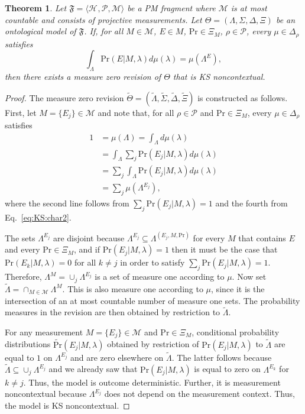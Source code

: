 \documentclass[DIV=calc,fontsize=12pt]{scrartcl} %
\theoremstyle{definition}
\theoremstyle{plain}
\newtheorem{theorem}[definition]{Theorem}
\newcommand{\Hilb}[1][]{\ensuremath{\mathcal{H}_{#1}}}
\begin{document}
\begin{theorem}
\label{prop:KS:conv}
Let $\mathfrak{F} = \langle \Hilb, \mathcal{P}, \mathcal{M} \rangle$
be a PM fragment where $\mathcal{M}$ is at most countable and
consists of projective measurements.  Let $\Theta = (\Lambda,
\Sigma, \Delta, \Xi)$ be an ontological model of $\mathfrak{F}$.
If, for all $M \in \mathcal{M}$, $E \in M$, $\mathrm{Pr} \in \Xi_M$,
$\rho \in \mathcal{P}$, every $\mu \in \Delta_{\rho}$ satisfies
\begin{equation}
\label{eq:KS:char2}
\int_{\Lambda} \mathrm{Pr}(E|M,\lambda) d\mu(\lambda) =
\mu(\Lambda^E),
\end{equation}
then there exists a measure zero revision of $\Theta$ that is KS
noncontextual.
\end{theorem}
\begin{proof}
The measure zero revision $\tilde{\Theta} = (\tilde{\Lambda},
\tilde{\Sigma}, \tilde{\Delta}, \tilde{\Xi})$ is constructed as
follows.  First, let $M = \{E_j\} \in \mathcal{M}$ and note that,
for all $\rho \in \mathcal{P}$ and $\text{Pr} \in \Xi_M$, every $\mu
\in \Delta_{\rho}$ satisfies
\begin{align}
1 & = \mu(\Lambda) = \int_{\Lambda} d \mu(\lambda) \\
& = \int_{\Lambda} \sum_j \text{Pr}(E_j|M,\lambda)
d \mu(\lambda) \\
& = \sum_j \int_{\Lambda} \text{Pr}(E_j|M,\lambda) d \mu(\lambda) \\
& = \sum_j \mu(\Lambda^{E_j}),
\end{align}
where the second line follows from $\sum_j \text{Pr}(E_j|M,\lambda)
= 1$ and the fourth from Eq.~\eqref{eq:KS:char2}.

The sets $\Lambda^{E_j}$ are disjoint because $\Lambda^{E_j}
\subseteq \Lambda^{(E_j,M,\text{Pr})}$ for every $M$ that contains
$E$ and every $\text{Pr} \in \Xi_M$, and if
$\text{Pr}(E_j|M,\lambda) = 1$ then it must be the case that
$\text{Pr}(E_k|M,\lambda) = 0$ for all $k \neq j$ in order to
satisfy $\sum_j \text{Pr}(E_j|M,\lambda) = 1$.  Therefore,
$\Lambda^M = \cup_j \Lambda^{E_j}$ is a set of measure one according
to $\mu$.  Now set $\tilde{\Lambda} = \cap_{M \in \mathcal{M}}
\Lambda^M$.  This is also measure one according to $\mu$, since it
is the intersection of an at most countable number of measure one
sets.  The probability measures in the revision are then obtained by
restriction to $\tilde{\Lambda}$.

For any measurement $M = \{E_j\} \in \mathcal{M}$ and $\text{Pr} \in
\Xi_M$, conditional probability distributions
$\tilde{\text{Pr}}(E_j|M,\lambda)$ obtained by restriction of
$\text{Pr}(E_j|M,\lambda)$ to $\tilde{\Lambda}$ are equal to $1$ on
$\Lambda^{E_j}$ and are zero elsewhere on $\tilde{\Lambda}$.  The
latter follows because $\tilde{\Lambda} \subseteq \cup_j
\Lambda^{E_j}$ and we already saw that $\text{Pr}(E_j|M,\lambda)$ is
equal to zero on $\Lambda^{E_k}$ for $k \neq j$.  Thus, the model is
outcome deterministic.  Further, it is measurement noncontextual
because $\Lambda^{E_j}$ does not depend on the measurement context.
Thus, the model is KS noncontextual.
\end{proof}
\end{document}
